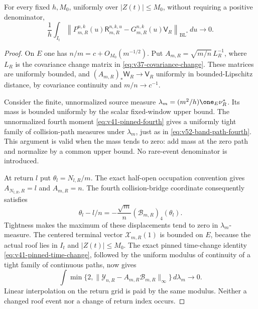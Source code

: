 \begin{lemma}
\label{lem:v52-return-transfer}
For every fixed $h,M_0$, uniformly over $|Z(t)|\le M_0$, without
requiring a positive denominator,
\begin{equation}\label{eq:v52-return-path-variation}
 \frac1h\int_{I_t}
 \left\|P_{m,R}^{n,k}(u)\mathsf R_{m,R}^{n,k,u}
                  -G_{m,R}^{n,k}(u)\mathsf V_R\right\|_{\mathrm{BL}^*}
                                                       \,du\longrightarrow0.
\end{equation}
\end{lemma}
\begin{proof}
On $E$ one has $n/m=c+O_{M_0}(m^{-1/2})$. Put
$A_{m,R}=\sqrt{m/n}\,L_R^{-1}$, where $L_R$ is the covariance change
matrix in \eqref{eq:v37-covariance-change}. These matrices are uniformly
bounded, and
$(A_{m,R})_*\mathsf W_R\to\mathsf V_R$ uniformly in bounded-Lipschitz
distance, by covariance continuity and $m/n\to c^{-1}$.

Consider the finite, unnormalized source measure
$\lambda_m=(m^2/h)\one_E\nu_R^*$. Its mass is bounded uniformly by
the scalar fixed-window upper bound. The unnormalized fourth moment
\eqref{eq:v41-pinned-fourth} gives a uniformly tight family of
collision-path measures under $\lambda_m$, just as in
\eqref{eq:v52-band-path-fourth}. This argument is valid when the
mass tends to zero: add mass at the zero path and normalize by a
common upper bound. No rare-event denominator is introduced.

At return $l$ put $\theta_l=N_{l,R}/m$. The exact half-open
occupation convention gives $A_{N_{l,R},R}=l$ and $A_{m,R}=n$.
The fourth collision-bridge coordinate consequently satisfies
\begin{equation}\label{eq:v52-exact-clock-displacement}
 \theta_l-l/n=-\frac{\sqrt m}{n}
                  (\mathcal B_{m,R})_4(\theta_l).
\end{equation}
Tightness makes the maximum of these displacements tend to zero in
$\lambda_m$-measure. The centered terminal vector
$\mathcal X_{m,R}(1)$ is bounded on $E$, because the actual roof lies
in $I_t$ and $|Z(t)|\le M_0$. The exact pinned time-change identity
\eqref{eq:v41-pinned-time-change}, followed by the uniform modulus
of continuity of a tight family of continuous paths, now gives
\begin{equation}\label{eq:v52-clock-coupling}
 \int \min\{2,\|\mathcal Y_{n,R}-A_{m,R}\mathcal B_{m,R}\|_\infty\}
                                                     \,d\lambda_m\to0.
\end{equation}
Linear interpolation on the return grid is paid by the same modulus.
Neither a changed roof event nor a change of return index occurs.


\end{proof}
